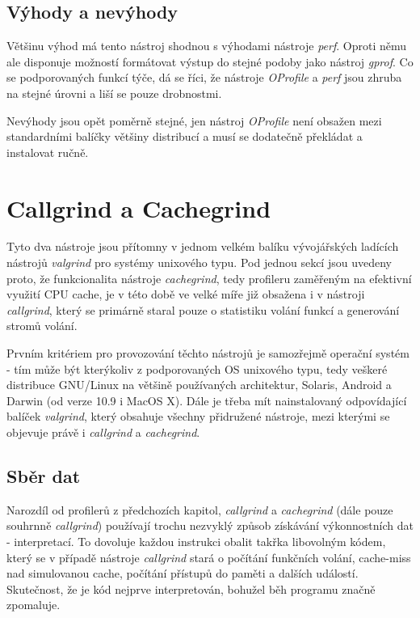 \documentclass[czech,BP]{thesiskiv}
\begin{document}
\subsection*{Výhody a nevýhody}

Většinu výhod má tento nástroj shodnou s výhodami nástroje \emph{perf}. Oproti němu ale disponuje možností formátovat výstup do stejné podoby jako nástroj \emph{gprof}. Co se podporovaných funkcí týče, dá se říci, že nástroje \emph{OProfile} a \emph{perf} jsou zhruba na stejné úrovni a liší se pouze drobnostmi.

Nevýhody jsou opět poměrně stejné, jen nástroj \emph{OProfile} není obsažen mezi standardními balíčky většiny distribucí a musí se dodatečně překládat a instalovat ručně.




\section{Callgrind a Cachegrind}

Tyto dva nástroje jsou přítomny v jednom velkém balíku vývojářských ladících nástrojů \emph{valgrind} pro systémy unixového typu. Pod jednou sekcí jsou uvedeny proto, že funkcionalita nástroje \emph{cachegrind}, tedy profileru zaměřeným na efektivní využití CPU cache, je v této době ve velké míře již obsažena i v nástroji \emph{callgrind}, který se primárně staral pouze o statistiku volání funkcí a generování stromů volání.

Prvním kritériem pro provozování těchto nástrojů je samozřejmě operační systém - tím může být kterýkoliv z podporovaných OS unixového typu, tedy veškeré distribuce GNU/Linux na většině používaných architektur, Solaris, Android a Darwin (od verze 10.9 i MacOS X)\cite{grind1}. Dále je třeba mít nainstalovaný odpovídající balíček \emph{valgrind}, který obsahuje všechny přidružené nástroje, mezi kterými se objevuje právě i \emph{callgrind} a \emph{cachegrind}.

\subsection*{Sběr dat}

Narozdíl od profilerů z předchozích kapitol, \emph{callgrind} a \emph{cachegrind} (dále pouze souhrnně \emph{callgrind}) používají trochu nezvyklý způsob získávání výkonnostních dat - interpretací. To dovoluje každou instrukci obalit takřka libovolným kódem, který se v případě nástroje \emph{callgrind} stará o počítání funkčních volání, cache-miss nad simulovanou cache, počítání přístupů do paměti a dalších událostí. Skutečnost, že je kód nejprve interpretován, bohužel běh programu značně zpomaluje.
\end{document}
